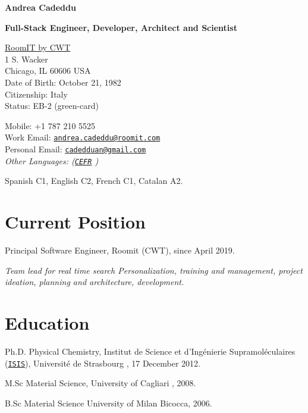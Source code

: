 \documentclass[11pt,letterpaper]{article}
\def\name{Andrea Cadeddu }
\renewenvironment{itemize}{
  \begin{list}{}{
    \setlength{\leftmargin}{1.5em}
  }
}{
  \end{list}
}
\begin{document}
{\huge \bf \name}

\vspace{0.25in}
{\Large \bf \sffamily Full-Stack Engineer, Developer, Architect and Scientist}

\vspace{0.25in}

\begin{minipage}[t]{0.5\textwidth}
  \href{http://www.roomit.com}{RoomIT by CWT} \\
  1 S. Wacker\\
Chicago, IL 60606
  USA \\
  Date of Birth: October 21, 1982 \\
  Citizenship: Italy\\
  Status: EB-2 (green-card)
\end{minipage}
\begin{minipage}[t]{0.5\textwidth}
  Mobile: +1 787 210 5525\\
  Work Email: \href{mailto:andrea.cadeddu@roomit.com}{\tt andrea.cadeddu@roomit.com} \\
  Personal Email: \href{mailto:cadedduan@gmail.com}{\tt cadedduan@gmail.com} \\
  \textit{Other Languages: (\href{http://en.wikipedia.org/wiki/Common_European_Framework_of_Reference_for_Languages}{\tt CEFR} )} 

Spanish C1,
English C2, 
French C1,
Catalan A2.

\end{minipage}

\section*{Current Position}

\begin{itemize}
\item Principal Software Engineer, Roomit (CWT), since April 2019. 

\textit{Team lead for real time search Personalization, training and management, project ideation, planning and architecture, development.}

\end{itemize}
\section*{Education}

\begin{itemize}

  \item  Ph.D. Physical Chemistry, Institut de Science et d'Ing\'enierie Supramol\'eculaires (\href{http://www-isis.u-strasbg.fr/}{\texttt{ISIS}}), Universit\'e de Strasbourg , 17 December 2012.

  \item  M.Sc Material Science, University of Cagliari , 2008.

  \item B.Sc Material Science University of Milan Bicocca, 2006.
  
\end{itemize}
\end{document}
